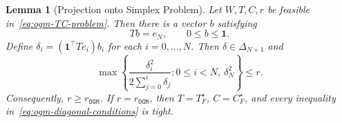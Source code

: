 \documentclass[11pt]{article}
\newtheorem{lemma}[thm]{Lemma}
\begin{document}
\begin{lemma}[Projection onto Simplex Problem]\label{lem:ogm-TC-projection}
Let $W,T,C,r$ be feasible in~\eqref{eq:ogm-TC-problem}. Then there is a
vector $b$ satisfying
\begin{equation}\label{eq:ogm-backward-solution}
    Tb=e_N,
    \qquad
    0\leq b\leq\mathbf1.
\end{equation}
Define $\delta_i=(\mathbf 1^\top Te_i)b_i$ for each $i=0,\dots,N$.
Then $\delta\in\Delta_{N+1}$ and
\begin{equation}\label{eq:ogm-projected-chain}
    \max\left\{
        \frac{\delta_i^2}{2\sum_{j=0}^i\delta_j}:0\leq i<N,
        \ \delta_N^2
    \right\}
    \leq r.
\end{equation}
Consequently, $r\geq r_\mathtt{OGM}$. If $r=r_\mathtt{OGM}$, then
$T=T_F^\star$, $C=C_F^\star$, and every inequality
in~\eqref{eq:ogm-diagonal-conditions} is tight.
\end{lemma}
\end{document}
